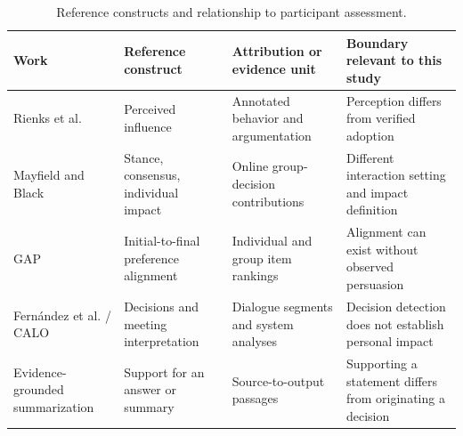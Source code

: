 \documentclass[journal]{IEEEtran}
\begin{document}
\begin{table}[t]
\caption{Reference constructs and relationship to participant assessment.}
\label{tab:1}
\centering\footnotesize
\setlength{\tabcolsep}{3pt}
\renewcommand{\arraystretch}{1.13}
\begin{tabular}{p{}p{}p{}p{}}
\toprule
{\raggedright Work\par} & {\raggedright Reference construct\par} & {\raggedright Attribution or evidence unit\par} & {\raggedright Boundary relevant to this study\par} \\
\midrule
{\raggedright Rienks et al.\par} & {\raggedright Perceived influence\par} & {\raggedright Annotated behavior and argumentation\par} & {\raggedright Perception differs from verified adoption\par} \\
{\raggedright Mayfield and Black\par} & {\raggedright Stance, consensus, individual impact\par} & {\raggedright Online group-decision contributions\par} & {\raggedright Different interaction setting and impact definition\par} \\
{\raggedright GAP\par} & {\raggedright Initial-to-final preference alignment\par} & {\raggedright Individual and group item rankings\par} & {\raggedright Alignment can exist without observed persuasion\par} \\
{\raggedright Fern\'{a}ndez et al. / CALO\par} & {\raggedright Decisions and meeting interpretation\par} & {\raggedright Dialogue segments and system analyses\par} & {\raggedright Decision detection does not establish personal impact\par} \\
{\raggedright Evidence-grounded summarization\par} & {\raggedright Support for an answer or summary\par} & {\raggedright Source-to-output passages\par} & {\raggedright Supporting a statement differs from originating a decision\par} \\

\end{tabular}
\end{table}
\end{document}
